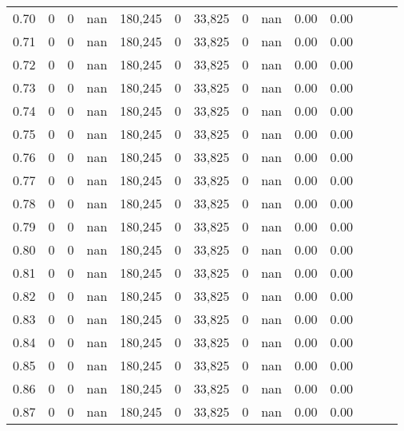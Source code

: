 \begin{tabular}{rrrrrrrrrrrrrr}
0.70 &       0 &      0 &   nan &  180,245 &        0 &  33,825 &       0 &   nan &  0.00 &      0.00 \\
0.71 &       0 &      0 &   nan &  180,245 &        0 &  33,825 &       0 &   nan &  0.00 &      0.00 \\
0.72 &       0 &      0 &   nan &  180,245 &        0 &  33,825 &       0 &   nan &  0.00 &      0.00 \\
0.73 &       0 &      0 &   nan &  180,245 &        0 &  33,825 &       0 &   nan &  0.00 &      0.00 \\
0.74 &       0 &      0 &   nan &  180,245 &        0 &  33,825 &       0 &   nan &  0.00 &      0.00 \\
0.75 &       0 &      0 &   nan &  180,245 &        0 &  33,825 &       0 &   nan &  0.00 &      0.00 \\
0.76 &       0 &      0 &   nan &  180,245 &        0 &  33,825 &       0 &   nan &  0.00 &      0.00 \\
0.77 &       0 &      0 &   nan &  180,245 &        0 &  33,825 &       0 &   nan &  0.00 &      0.00 \\
0.78 &       0 &      0 &   nan &  180,245 &        0 &  33,825 &       0 &   nan &  0.00 &      0.00 \\
0.79 &       0 &      0 &   nan &  180,245 &        0 &  33,825 &       0 &   nan &  0.00 &      0.00 \\
0.80 &       0 &      0 &   nan &  180,245 &        0 &  33,825 &       0 &   nan &  0.00 &      0.00 \\
0.81 &       0 &      0 &   nan &  180,245 &        0 &  33,825 &       0 &   nan &  0.00 &      0.00 \\
0.82 &       0 &      0 &   nan &  180,245 &        0 &  33,825 &       0 &   nan &  0.00 &      0.00 \\
0.83 &       0 &      0 &   nan &  180,245 &        0 &  33,825 &       0 &   nan &  0.00 &      0.00 \\
0.84 &       0 &      0 &   nan &  180,245 &        0 &  33,825 &       0 &   nan &  0.00 &      0.00 \\
0.85 &       0 &      0 &   nan &  180,245 &        0 &  33,825 &       0 &   nan &  0.00 &      0.00 \\
0.86 &       0 &      0 &   nan &  180,245 &        0 &  33,825 &       0 &   nan &  0.00 &      0.00 \\
0.87 &       0 &      0 &   nan &  180,245 &        0 &  33,825 &       0 &   nan &  0.00 &      0.00 \\

\end{tabular}

